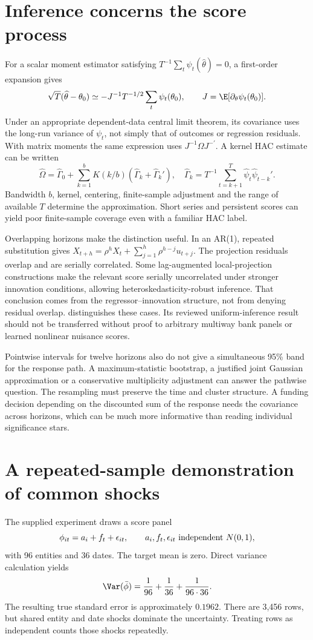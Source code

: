 \section{Inference concerns the score process}
For a scalar moment estimator satisfying
$T^{-1}\sum_t\psi_t(\widehat\theta)=0$, a first-order expansion gives
\[
 \sqrt T(\widehat\theta-\theta_0)
 \simeq -J^{-1}T^{-1/2}\sum_t\psi_t(\theta_0),
 \qquad J=\E[\partial_\theta\psi_t(\theta_0)].
\]
Under an appropriate dependent-data central limit theorem, its covariance
uses the long-run variance of $\psi_t$, not simply that of outcomes or
regression residuals. With matrix moments the same expression uses
$J^{-1}\Omega J^{-\prime}$. A kernel HAC estimate can be written
\[
 \widehat\Omega=\widehat\Gamma_0+
 \sum_{k=1}^{b}K(k/b)(\widehat\Gamma_k+\widehat\Gamma_k'),
 \quad \widehat\Gamma_k=T^{-1}\sum_{t=k+1}^{T}
     \widehat\psi_t\widehat\psi_{t-k}'.
\]
Bandwidth $b$, kernel, centering, finite-sample adjustment and the range of
available $T$ determine the approximation. Short series and persistent
scores can yield poor finite-sample coverage even with a familiar HAC label.

Overlapping horizons make the distinction useful. In an AR(1), repeated
substitution gives
$X_{t+h}=\rho^h X_t+\sum_{j=1}^{h}\rho^{h-j}u_{t+j}$.
The projection residuals overlap and are serially correlated. Some
lag-augmented local-projection constructions make the relevant score
serially uncorrelated under stronger innovation conditions, allowing
heteroskedasticity-robust inference. That conclusion comes from the
regressor--innovation structure, not from denying residual overlap.
\citet[Section 6]{jorda2024} distinguishes these cases. Its reviewed
uniform-inference result should not be transferred without proof to arbitrary
multiway bank panels or learned nonlinear nuisance scores.

Pointwise intervals for twelve horizons also do not give a simultaneous
95\% band for the response path. A maximum-statistic bootstrap, a justified
joint Gaussian approximation or a conservative multiplicity adjustment
can answer the pathwise question. The resampling must preserve the time
and cluster structure. A funding decision depending on the discounted sum
of the response needs the covariance across horizons, which can be much
more informative than reading individual significance stars.

\section{A repeated-sample demonstration of common shocks}
The supplied experiment draws a score panel
\[
 \phi_{it}=a_i+f_t+\epsilon_{it},\qquad
 a_i,f_t,\epsilon_{it}\ \hbox{independent }N(0,1),
\]
with 96 entities and 36 dates. The target mean is zero. Direct variance
calculation yields
\begin{equation}
 \Var(\bar\phi)=\frac1{96}+\frac1{36}+\frac1{96\cdot36}.
 \label{eq:crossed-variance}
\end{equation}
The resulting true standard error is approximately $0.1962$.
There are 3,456 rows, but shared entity and date shocks dominate the
uncertainty. Treating rows as independent counts those shocks repeatedly.

